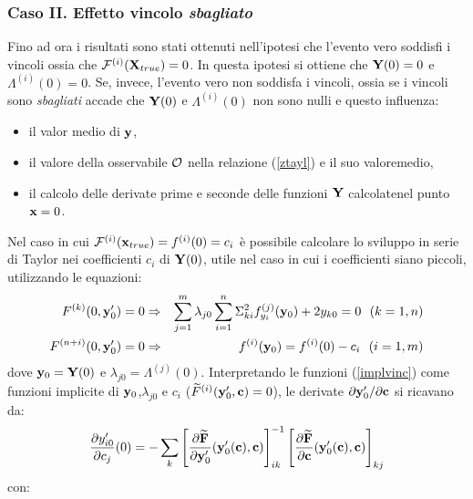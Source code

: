 \subsubsection{Caso II. Effetto vincolo {\em sbagliato}}
Fino ad ora i risultati sono stati ottenuti nell'ipotesi che l'evento vero soddisfi
i vincoli ossia che ${\cal F}^{(i)}({\bf X}_{true})=0$. In questa ipotesi si ottiene che
${\bf Y}(0)=0$ e $\Lambda^{(i)}(0)=0$. Se, invece, l'evento vero non soddisfa i
vincoli, ossia se i vincoli sono {\em sbagliati} accade che ${\bf Y}(0)$ e $\Lambda^{(i)}(0)$ non sono nulli e questo influenza:
\begin{itemize}
\item il valor medio di ${\bf y}$,\item il valore della osservabile ${\cal O}$ nella relazione (\ref{ztayl}) e il suo valoremedio,
\item il calcolo delle derivate prime e seconde delle funzioni ${\bf Y}$ calcolatenel punto ${\bf x}=0$.
\end{itemize}
Nel caso in cui ${\cal F}^{(i)}({\bf x}_{true})=f^{(i)}(0)=c_i$ \`e possibile calcolare lo sviluppo in serie di Taylor nei coefficienti $c_i$ di ${\bf Y}(0)$, utile nel caso
in cui i coefficienti siano piccoli, utilizzando le equazioni:
\begin{eqnarray}
\label{implvinc}
F^{(k)}(0,\bfy^\prime_0)=0 &\Rightarrow&\sum_{j=1}^m\lambda_{j0}\sum_{i=1}^n\Stwo_{ki}\fxes{j}_{y_i}(\bfy_0)+2y_{k0}=0\ \ (k=1,n)\nonumber\\
F^{(n+i)}(0,\bfy^\prime_0)=0&\Rightarrow&\fxes{i}(\bfy_0)=\fxes{i}(0)-c_i\ \ (i=1,m)
\end{eqnarray}
dove ${\bf y}_0={\bf Y}(0)$ e $\lambda_{j0}=\Lambda^{(j)}(0)$.  Interpretando le funzioni (\ref{implvinc}) come funzioni implicite di ${\bf y}_0$,$\lambda_{j0}$ e $c_i$ ($\widetilde F^{(i)}({\bf y}^\prime_0,{\bf c})=0$), le derivate $\partial{\bf y}^\prime_0/\partial {\bf c}$ si ricavano da:\[\frac{\partial y^\prime_{i0}}{\partial c_j}(0)=-\sum_k\left[\frac{\partial{\bf\widetilde F}}{\partial{\bf y}^\prime_0}({\bf y}^\prime_0({\bf c}),{\bf c})\right]^{-1}_{ik}\left[\frac{\partial{\bf\widetilde F}}{\partial{\bf c}}({\bf y}^\prime_0({\bf c}),{\bf c})\right]_{kj}\]
con:

